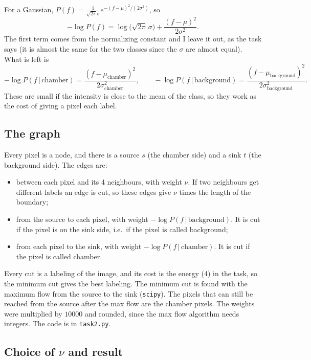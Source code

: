 \documentclass[11pt,a4paper]{article}
\begin{document}
For a Gaussian, $P(f)=\frac{1}{\sqrt{2\pi}\sigma}e^{-(f-\mu)^2/(2\sigma^2)}$, so
\begin{equation}
  -\log P(f)=\log\!\big(\sqrt{2\pi}\,\sigma\big)+\frac{(f-\mu)^2}{2\sigma^2}.
\end{equation}
The first term comes from the normalizing constant and I leave it out, as the task says (it is almost the same for the
two classes since the $\sigma$ are almost equal). What is left is
\begin{equation}
  -\log P(f\,|\,\text{chamber})=\frac{(f-\mu_{\text{chamber}})^2}{2\sigma_{\text{chamber}}^2},\qquad
  -\log P(f\,|\,\text{background})=\frac{(f-\mu_{\text{background}})^2}{2\sigma_{\text{background}}^2}.
\end{equation}
These are small if the intensity is close to the mean of the class, so they work as the cost of giving a
pixel each label.

\subsection{The graph}

Every pixel is a node, and there is a source $s$ (the chamber side) and a sink $t$ (the background side).
The edges are:
\begin{itemize}
  \item between each pixel and its 4 neighbours, with weight $\nu$. If two neighbours get different labels an
    edge is cut, so these edges give $\nu$ times the length of the boundary;
  \item from the source to each pixel, with weight $-\log P(f\,|\,\text{background})$. It is cut if the
    pixel is on the sink side, i.e.\ if the pixel is called background;
  \item from each pixel to the sink, with weight $-\log P(f\,|\,\text{chamber})$. It is cut if the
    pixel is called chamber.
\end{itemize}
Every cut is a labeling of the image, and its cost is the energy (4) in the task, so the minimum cut gives the
best labeling. The minimum cut is found with the maximum flow from the source to the sink (\texttt{scipy}). The
pixels that can still be reached from the source after the max flow are the chamber pixels. The weights were
multiplied by $10000$ and rounded, since the max flow algorithm needs integers. The code is in \texttt{task2.py}.

\subsection{Choice of $\nu$ and result}
\end{document}
